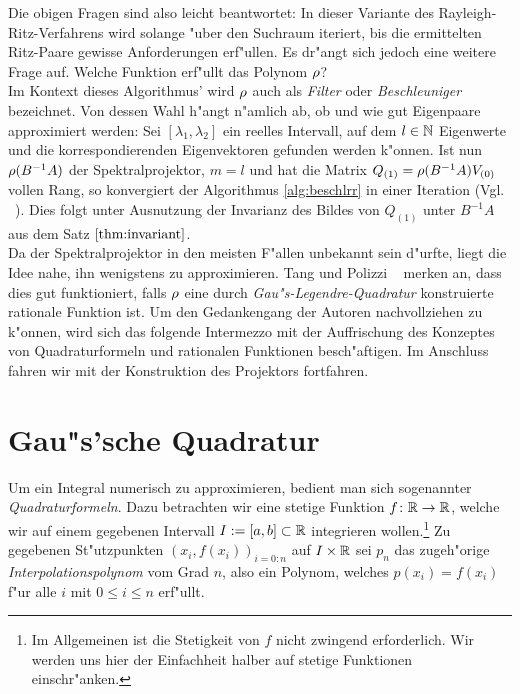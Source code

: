 Die obigen Fragen sind also leicht beantwortet: In dieser Variante des Rayleigh-Ritz-Verfahrens wird solange "uber den Suchraum iteriert, bis die ermittelten Ritz-Paare gewisse Anforderungen erf"ullen.
Es dr"angt sich jedoch eine weitere Frage auf. Welche Funktion erf"ullt das Polynom $\rho$?\\

Im Kontext dieses Algorithmus' wird $\rho$ auch als \emph{Filter} oder \emph{Beschleuniger}
bezeichnet. Von dessen Wahl h"angt n"amlich ab, ob und wie gut Eigenpaare approximiert
werden: Sei $[\lambda_1,\lambda_2]$ ein reelles Intervall, auf dem $l\in\mathbb{N}$ Eigenwerte und die korrespondierenden Eigenvektoren gefunden werden k"onnen. Ist nun $\rho(B^{-1}A)$ der Spektralprojektor,
$m=l$ und hat die Matrix $Q_{(1)} = \rho(B^{-1}A) V_{(0)}$ vollen Rang, so konvergiert der Algorithmus \ref{alg:beschlrr} in einer Iteration
(Vgl. ~\cite[356]{ptep}).
Dies folgt unter Ausnutzung der Invarianz des Bildes von $Q_{(1)}$ unter $B^{-1}A$
aus dem Satz $\ref{thm:invariant}$.\\

Da der Spektralprojektor in den meisten F"allen unbekannt sein d"urfte, liegt
die Idee nahe, ihn wenigstens zu approximieren. Tang und Polizzi ~\cite[356]{ptep} merken an, dass dies gut funktioniert, falls $\rho$ eine durch \emph{Gau"s-Legendre-Quadratur} konstruierte rationale Funktion ist.
Um den Gedankengang der Autoren nachvollziehen zu k"onnen, wird sich das folgende Intermezzo mit der Auffrischung des Konzeptes von Quadraturformeln und rationalen Funktionen besch"aftigen. Im Anschluss fahren wir mit der
Konstruktion des Projektors fortfahren.

\section{Gau"s'sche Quadratur}

Um ein Integral numerisch zu approximieren, bedient man sich sogenannter \emph{Quadraturformeln}. Dazu betrachten wir eine stetige Funktion $f\colon\mathbb{R}\to\mathbb{R}$, welche wir auf einem gegebenen Intervall $I:=[a,b]\subset\mathbb{R}$ integrieren wollen.\footnote{Im Allgemeinen ist die Stetigkeit von $f$ nicht zwingend erforderlich. Wir werden uns hier der Einfachheit halber auf stetige Funktionen einschr"anken.}
Zu gegebenen St"utzpunkten $(x_i, f(x_i))_{i=0:n}$ auf $I\times\mathbb{R}$ sei $p_n$ das zugeh"orige \emph{Interpolationspolynom} vom Grad $n$, also ein Polynom, welches $p(x_i) = f(x_i)$ f"ur alle $i$ mit $0\le i\le n$ erf"ullt.\\

